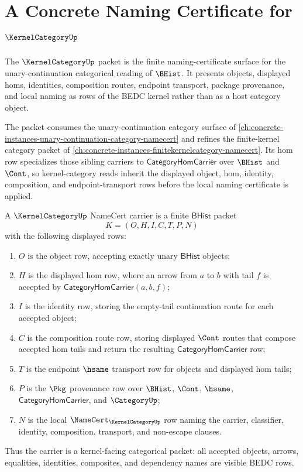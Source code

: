 \chapter{A Concrete Naming Certificate for $\KernelCategoryUp$}
\label{ch:concrete-instances-kernel-category-namecert}

The $\KernelCategoryUp$ packet is the finite naming-certificate surface for
the unary-continuation categorical reading of $\BHist$. It presents objects,
displayed homs, identities, composition routes, endpoint transport, package
provenance, and local naming as rows of the BEDC kernel rather than as a host
category object.

The packet consumes the unary-continuation category surface of \autoref{ch:concrete-instances-unary-continuation-category-namecert} and refines the finite-kernel category packet of \autoref{ch:concrete-instances-finitekernelcategory-namecert}. Its hom row specializes those sibling carriers to $\mathsf{CategoryHomCarrier}$ over $\BHist$ and $\Cont$, so kernel-category reads inherit the displayed object, hom, identity, composition, and endpoint-transport rows before the local naming certificate is applied.

\begin{definition}
\label{def:kernel-category-namecert-carrier}
A $\KernelCategoryUp$ NameCert carrier is a finite $\mathsf{BHist}$ packet
$$
K=(O,H,I,C,T,P,N)
$$
with the following displayed rows:
\begin{enumerate}
\item $O$ is the object row, accepting exactly unary $\mathsf{BHist}$ objects;
\item $H$ is the displayed hom row, where an arrow from $a$ to $b$ with tail
$f$ is accepted by $\mathsf{CategoryHomCarrier}(a,b,f)$;
\item $I$ is the identity row, storing the empty-tail continuation route for
each accepted object;
\item $C$ is the composition route row, storing displayed $\Cont$ routes that
compose accepted hom tails and return the resulting
$\mathsf{CategoryHomCarrier}$ row;
\item $T$ is the endpoint $\hsame$ transport row for objects and displayed hom
tails;
\item $P$ is the $\Pkg$ provenance row over $\BHist$, $\Cont$, $\hsame$,
$\mathsf{CategoryHomCarrier}$, and $\CategoryUp$;
\item $N$ is the local $\NameCert_{\KernelCategoryUp}$ row naming the carrier,
classifier, identity, composition, transport, and non-escape clauses.
\end{enumerate}
Thus the carrier is a kernel-facing categorical packet: all accepted objects,
arrows, equalities, identities, composites, and dependency names are visible
BEDC rows.
\end{definition}


